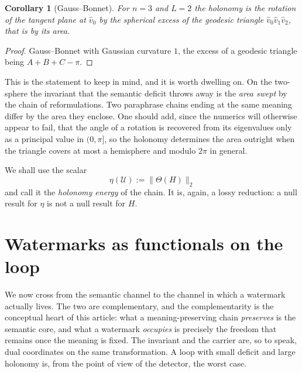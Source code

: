 \documentclass{article}
\theoremstyle{plain}
\newtheorem{corollary}[theorem]{Corollary}
\theoremstyle{definition}
\numberwithin{equation}{section}
\newcommand{\Uc}{\mathcal{U}}
\begin{document}
\begin{corollary}[Gauss--Bonnet]\label{cor:gaussbonnet}
For $n = 3$ and $L = 2$ the holonomy is the rotation of the tangent
plane at $\hat{v}_0$ by the spherical excess of the geodesic triangle
$\hat{v}_0\hat{v}_1\hat{v}_2$, that is by its area.
\end{corollary}

\begin{proof}
Gauss--Bonnet with Gaussian curvature $1$, the excess of a geodesic
triangle being $A+B+C-\pi$.
\end{proof}

This is the statement to keep in mind, and it is worth dwelling on. On
the two-sphere the invariant that the semantic deficit throws away is
the \emph{area swept} by the chain of reformulations. Two paraphrase
chains ending at the same meaning differ by the area they enclose. One
should add, since the numerics will otherwise appear to fail, that the
angle of a rotation is recovered from its eigenvalues only as a
principal value in $(0,\pi]$, so the holonomy determines the area
outright when the triangle covers at most a hemisphere and modulo
$2\pi$ in general.

We shall use the scalar
\begin{equation}\label{eq:holenergy}
\eta(\Uc) := \|\Theta(H)\|_2
\end{equation}
and call it the \emph{holonomy energy} of the chain. It is, again, a
lossy reduction: a null result for $\eta$ is not a null result for $H$.

\section{Watermarks as functionals on the loop}\label{sec:watermark}

We now cross from the semantic channel to the channel in which a
watermark actually lives. The two are complementary, and the complementarity
is the conceptual heart of this article: what a meaning-preserving chain
\emph{preserves} is the semantic core, and what a watermark
\emph{occupies} is precisely the freedom that remains once the meaning is
fixed. The invariant and the carrier are, so to speak, dual coordinates
on the same transformation. A loop with small deficit and large holonomy
is, from the point of view of the detector, the worst case.
\end{document}
